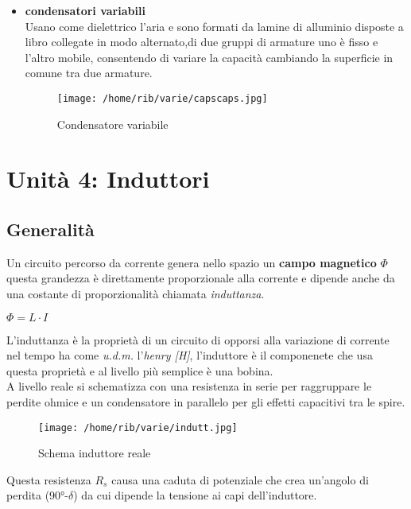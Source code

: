 \documentclass{article}
\begin{document}
\begin{itemize}
    \item \textbf{condensatori variabili}\\
    Usano come dielettrico l'aria e sono formati da lamine di alluminio disposte a libro collegate in modo alternato,di due gruppi di armature uno è fisso e l'altro mobile, consentendo di variare la capacità cambiando la superficie in comune tra due armature.
    \begin{figure}[H]
        \centering
        \texttt{[image: /home/rib/varie/capscaps.jpg]}
        \caption{Condensatore variabile}
        \label{varcap}
    \end{figure}
\end{itemize}
    
\section{Unità 4: Induttori}
\subsection{Generalità}
Un circuito percorso da corrente genera nello spazio un \textbf{campo magnetico} $\Phi$ questa grandezza è direttamente proporzionale 
alla corrente e dipende anche da una costante di proporzionalità chiamata \textit{induttanza}.
\begin{center}
    $\Phi=L\cdot I$
\end{center}
L'induttanza è la proprietà di un circuito di opporsi alla variazione di corrente nel tempo ha come \textit{u.d.m.} l'\emph{henry [H]}, l'induttore è il componenete che usa questa 
proprietà e al livello più semplice è una bobina.\\
A livello reale si schematizza con una resistenza in serie per raggruppare le perdite ohmice e un condensatore in parallelo per gli effetti capacitivi tra le spire.\\
\begin{figure}[H]
    \centering
        \texttt{[image: /home/rib/varie/indutt.jpg]}
        \caption{Schema induttore reale}
        \label{indutt}
\end{figure}
\noindent
Questa resistenza $R_s$ causa una caduta di potenziale che crea un'angolo di perdita (90°-$\delta$) da cui dipende la tensione ai capi dell'induttore.
\end{document}
